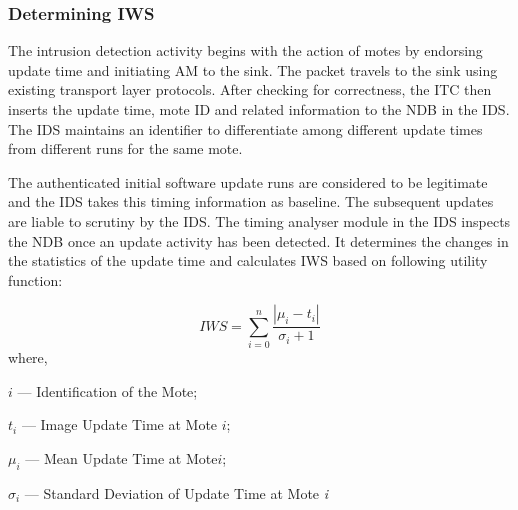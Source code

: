 \documentclass[conference,manuscript]{IEEEtran}
\begin{document}
\subsubsection{Determining IWS}
\label{ssc:cal_iws}


The intrusion detection activity begins with the action of motes by endorsing update time and initiating AM to the sink. 
The packet travels to the sink using existing transport layer protocols.
After checking for correctness, the ITC then inserts the update time, mote ID and related information to the NDB in the IDS.
The IDS maintains an identifier to differentiate among different update times from different runs for the same mote.
%

The authenticated initial software update runs are considered to be legitimate and the IDS takes this timing information as baseline.
The subsequent updates are liable to scrutiny by the IDS.
The timing analyser module in the IDS inspects the NDB once an update activity has been detected.
It determines the changes in the statistics of the update time and calculates IWS based on following utility function:

\begin{equation}
\label{eqn2} 
	\mathit{IWS} = \sum \limits_{i=0}^{n} \frac{\left| \mu_i - t_i \right|}{\sigma_i + 1}
	\end{equation}
where, 
\begin{inparaenum}
\item $\mathit{i}$ --- Identification of the Mote;  
\item $\mathit{t_i}$ --- Image Update Time at Mote $\mathit{i}$; 
\item $\mathit{\mu_i}$ --- Mean Update Time at Mote$\mathit{i}$; 
\item $\mathit{\sigma_i}$ --- Standard Deviation of Update Time at Mote \emph{i} 
\end{inparaenum}	
\end{document}
